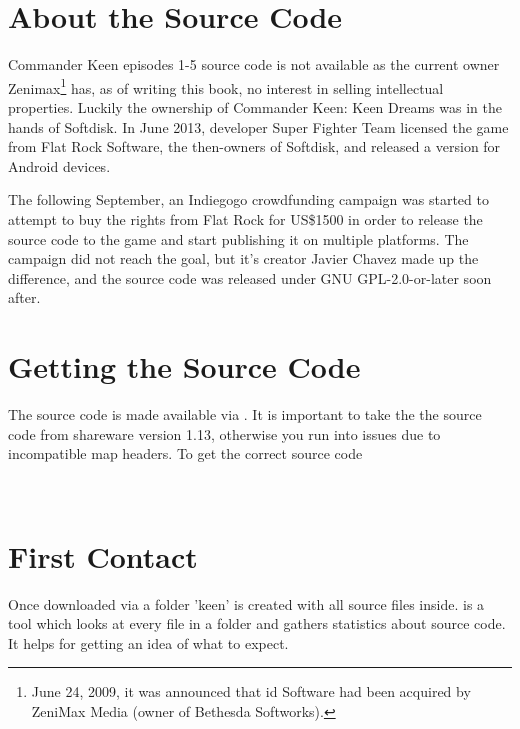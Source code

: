 \documentclass[book.tex]{subfiles}
\begin{document}
\label{chapter_software_architecture}
\section{About the Source Code}
Commander Keen episodes 1-5 source code is not available as the current owner Zenimax\footnote{June 24, 2009, it was announced that id Software had been acquired by ZeniMax Media (owner of Bethesda Softworks).} has, as of writing this book, no interest in selling intellectual properties. Luckily the ownership of Commander Keen: Keen Dreams was in the hands of Softdisk. In June 2013, developer Super Fighter Team licensed the game from Flat Rock Software, the then-owners of Softdisk, and released a version for Android devices. \\
\par
The following September, an Indiegogo crowdfunding campaign was started to attempt to buy the rights from Flat Rock for US\$1500 in order to release the source code to the game and start publishing it on multiple platforms. The campaign did not reach the goal, but it's creator Javier Chavez made up the difference, and the source code was released under GNU GPL-2.0-or-later soon after.

\section{Getting the Source Code}
\par
The source code is made available via . It is important to take the the source code from shareware version 1.13, otherwise you run into issues due to incompatible map headers. To get the correct source code \\
\par
{}\\
\par
\section{First Contact}
Once downloaded via  a folder 'keen' is created with all source files inside.
 is a tool which looks at every file in a folder and gathers statistics about source code. It helps for getting an idea of what to expect.\\
\par

\begin{minipage}{\textwidth}

\end{minipage}
\end{document}
